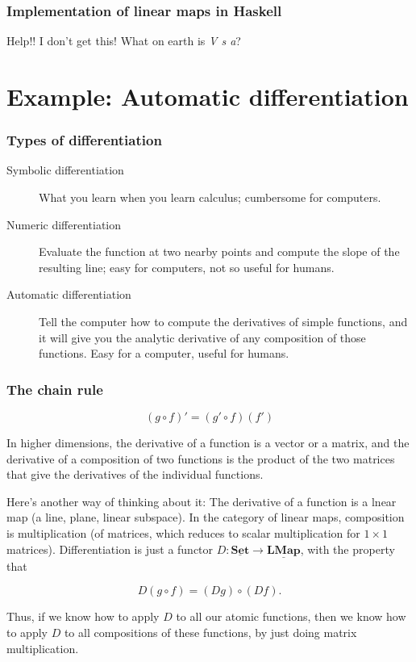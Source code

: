 \documentclass[10pt]{beamer}
\newcommand{\Cat}[1]{\ensuremath{\underline{\mathbf{#1}}}}
\theoremstyle{definition}
\theoremstyle{remark}
\numberwithin{equation}{section}
\begin{document}
\begin{frame}[fragile]
  \frametitle{Implementation of linear maps in Haskell}

  Help!! I don't get this! What on earth is \emph{V s a}?
\end{frame}

\section{Example: Automatic differentiation}

\begin{frame}[fragile]
  \frametitle{Types of differentiation}

  \begin{description}
  \item[Symbolic differentiation] What you learn when you learn calculus;
    cumbersome for computers.
  \item[Numeric differentiation] Evaluate the function at two nearby points and
    compute the slope of the resulting line; easy for computers, not so useful
    for humans.
  \item[Automatic differentiation] Tell the computer how to compute the
    derivatives of simple functions, and it will give you the analytic
    derivative of any composition of those functions. Easy for a computer,
    useful for humans.
  \end{description}
\end{frame}

\begin{frame}[fragile]
  \frametitle{The chain rule}

  \[(g \circ f)' = (g' \circ f) (f')\]

  In higher dimensions, the derivative of a function is a vector or a matrix,
  and the derivative of a composition of two functions is the product of the two
  matrices that give the derivatives of the individual functions.

  Here's another way of thinking about it: The derivative of a function is a
  lnear map (a line, plane, linear subspace). In the category of linear maps,
  composition is multiplication (of matrices, which reduces to scalar
  multiplication for $1 \times 1$ matrices). Differentiation is just a functor
  $D\colon \Cat{Set} \rightarrow \Cat{LMap}$, with the property that

  \[
    D(g \circ f) = (D g) \circ (D f).
  \]

  Thus, if we know how to apply $D$ to all our atomic functions, then we know
  how to apply $D$ to all compositions of these functions, by just doing matrix multiplication.
  
\end{frame}
\end{document}
